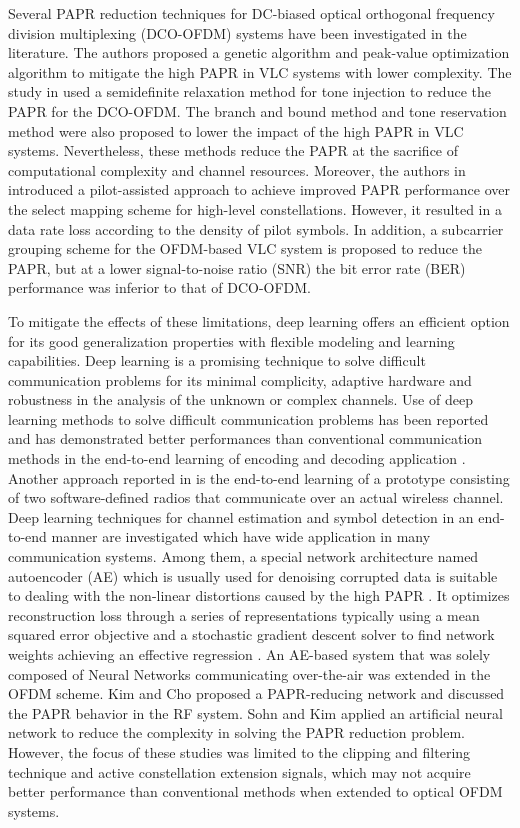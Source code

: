 \documentclass[conference]{IEEEtran}
\begin{document}
Several PAPR reduction techniques for DC-biased optical orthogonal frequency division multiplexing (DCO-OFDM) systems have been investigated in the literature. The authors proposed a genetic algorithm and peak-value optimization algorithm \cite{b12} to mitigate the high PAPR in VLC systems with lower complexity. The study in \cite{b13} used a semidefinite relaxation method for tone injection to reduce the PAPR for the DCO-OFDM. The branch and bound method \cite{b14} and tone reservation method \cite{b15} were also proposed to lower the impact of the high PAPR in VLC systems. Nevertheless, these methods reduce the PAPR at the sacrifice of computational complexity and channel resources. Moreover, the authors in \cite{b16} introduced a pilot-assisted approach to achieve improved PAPR performance over the select mapping scheme for high-level constellations. However, it resulted in a data rate loss according to the density of pilot symbols. In addition, a subcarrier grouping scheme for the OFDM-based VLC system \cite{b17} is proposed to reduce the PAPR, but at a lower signal-to-noise ratio (SNR) the bit error rate (BER) performance was inferior to that of DCO-OFDM.

To mitigate the effects of these limitations, deep learning offers an efficient option for its good generalization properties with flexible modeling and learning capabilities. Deep learning is a promising technique to solve difficult communication problems \cite{b18} for its minimal complicity, adaptive hardware and robustness in the analysis of the unknown or complex channels. Use of deep learning methods to solve difficult communication problems has been reported and has demonstrated better performances than conventional communication methods in the end-to-end learning of encoding and decoding application \cite{b19}. Another approach reported in \cite{b20} is the end-to-end learning of a prototype consisting of two software-defined radios that communicate over an actual wireless channel. Deep learning techniques for channel estimation and symbol detection in an end-to-end manner \cite{b21} are investigated which have wide application in many communication systems. Among them, a special network architecture named autoencoder (AE) which is usually used for denoising corrupted data is suitable to dealing with the non-linear distortions caused by the high PAPR \cite{b22}. It optimizes reconstruction loss through a series of representations typically using a mean squared error objective and a stochastic gradient descent solver to find network weights achieving an effective regression \cite{b23}. An AE-based system \cite{b24} that was solely composed of Neural Networks communicating over-the-air was extended in the OFDM scheme. Kim and Cho \cite{b22} proposed a PAPR-reducing network and discussed the PAPR behavior in the RF system. Sohn and Kim \cite{b25}\cite{b26} applied an artificial neural network to reduce the complexity in solving the PAPR reduction problem. However, the focus of these studies was limited to the clipping and filtering technique and active constellation extension signals, which may not acquire better performance than conventional methods when extended to optical OFDM systems.
\end{document}
